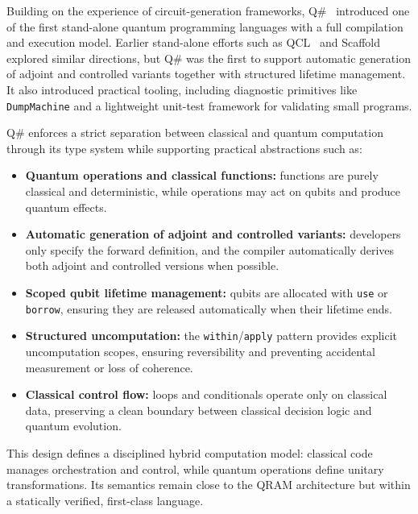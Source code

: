 Building on the experience of circuit-generation frameworks, Q\#~\cite{qsharp} introduced one of the first stand-alone quantum programming languages with a full compilation and execution model. Earlier stand-alone efforts such as QCL~\cite{omer2005classical} and Scaffold~\cite{ScaffCC} explored similar directions, but Q\# was the first to support automatic generation of adjoint and controlled variants together with structured lifetime management. It also introduced practical tooling, including diagnostic primitives like \texttt{DumpMachine} and a lightweight unit-test framework for validating small programs.

Q\# enforces a strict separation between classical and quantum computation through its type system while supporting practical abstractions such as:
\begin{itemize}
  \item \textbf{Quantum operations and classical functions:} functions are purely classical and deterministic, while operations may act on qubits and produce quantum effects.
  \item \textbf{Automatic generation of adjoint and controlled variants:} developers only specify the forward definition, and the compiler automatically derives both adjoint and controlled versions when possible.
  \item \textbf{Scoped qubit lifetime management:} qubits are allocated with \texttt{use} or \texttt{borrow}, ensuring they are released automatically when their lifetime ends.
  \item \textbf{Structured uncomputation:} the \texttt{within}/\texttt{apply} pattern provides explicit uncomputation scopes, ensuring reversibility and preventing accidental measurement or loss of coherence.
  \item \textbf{Classical control flow:} loops and conditionals operate only on classical data, preserving a clean boundary between classical decision logic and quantum evolution.
\end{itemize}

This design defines a disciplined hybrid computation model: classical code manages orchestration and control, while quantum operations define unitary transformations. 
Its semantics remain close to the QRAM architecture but within a statically verified, first-class language.

